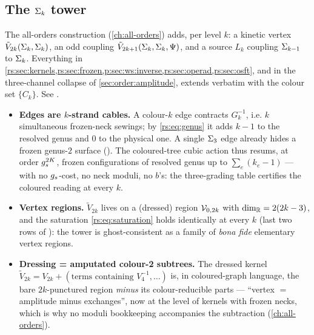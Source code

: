 \subsection{The \texorpdfstring{$\Sigma_k$}{Sigma_k} tower}
\label{rs:sec:tower}

The all-orders construction (\cref{ch:all-orders}) adds, per level $k$: a kinetic
vertex $\tilde V_{2k}(\Sigma_k,\Sigma_k)$, an odd coupling
$\tilde V_{2k+1}(\Sigma_k,\Sigma_k,\Psi)$, and a source $L_k$ coupling $\Sigma_{k-1}$ to
$\Sigma_k$. Everything in \cref{rs:sec:kernels,rs:sec:frozen,p:sec:ws:inverse,rs:sec:operad,rs:sec:osft}, and in the three-channel collapse of \cref{sec:order:amplitude},
extends verbatim with the colour set $\{C_k\}$. See .

\begin{itemize}[leftmargin=*]
	\setlength{\itemsep}{1ex}

	\item \textbf{Edges are $k$-strand cables.} A colour-$k$ edge contracts
	$G_k^{-1}$, i.e. $k$ simultaneous frozen-neck sewings; by \eqref{rs:eq:genus} it
	adds $k-1$ to the resolved genus and $0$ to the physical one. A single $\Sigma_3$
	edge already hides a frozen genus-$2$ surface (). The
	coloured-tree cubic action thus resums, at order $g_s^{2K}$, frozen
	configurations of resolved genus up to $\sum_e(k_e-1)$ --- with no $g_s$-cost,
	no neck moduli, no $b$'s: the three-grading table certifies the coloured
	reading at every $k$.

	\item \textbf{Vertex regions.} $\tilde V_{2k}$ lives on a (dressed) region
	${\mathcal{V}}_{0,2k}$ with $\dim_{\mathbb{R}}=2(2k-3)$, and the saturation
	\eqref{rs:eq:saturation} holds identically at every $k$ (last two rows of
	): the tower is ghost-consistent as a family of
	\emph{bona fide} elementary vertex regions.

	\item \textbf{Dressing = amputated colour-2 subtrees.} The dressed kernel
	$\tilde V_{2k}=V_{2k}+(\text{terms containing }V_4^{-1},\dots)$ is, in coloured-graph
	language, the bare $2k$-punctured region \emph{minus} its colour-reducible
	parts --- ``vertex $=$ amplitude minus exchanges'', now at the level of kernels
	with frozen necks, which is why no moduli bookkeeping accompanies the
	subtraction (\cref{ch:all-orders}).


\end{itemize}

